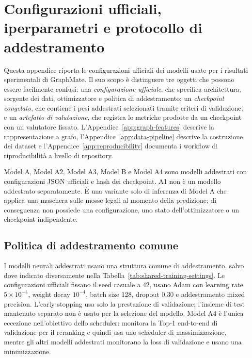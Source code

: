 \chapter{Configurazioni ufficiali, iperparametri e protocollo di addestramento}
\label{app:hyperparameters}

Questa appendice riporta le configurazioni ufficiali dei modelli usate per i risultati sperimentali di GraphMate.  Il suo scopo è distinguere tre oggetti che possono essere facilmente confusi: una \emph{configurazione ufficiale}, che specifica architettura, sorgente dei dati, ottimizzatore e politica di addestramento; un \emph{checkpoint congelato}, che contiene i pesi addestrati selezionati tramite criteri di validazione; e un \emph{artefatto di valutazione}, che registra le metriche prodotte da un checkpoint con un valutatore fissato.  L'Appendice~\ref{app:graph-features} descrive la rappresentazione a grafo, l'Appendice~\ref{app:data-pipeline} descrive la costruzione dei dataset e l'Appendice~\ref{app:reproducibility} documenta i workflow di riproducibilità a livello di repository.

Model A, Model A2, Model A3, Model B e Model A4 sono modelli addestrati con configurazioni JSON ufficiali e hash dei checkpoint.  A1 non è un modello addestrato separatamente.  È una variante solo di inferenza di Model A che applica una maschera sulle mosse legali al momento della predizione; di conseguenza non possiede una configurazione, uno stato dell'ottimizzatore o un checkpoint indipendente.

\section{Politica di addestramento comune}
\label{app:hyperparameters:shared}

I modelli neurali addestrati usano una struttura comune di addestramento, salvo dove indicato diversamente nella Tabella~\ref{tab:shared-training-settings}.  Le configurazioni ufficiali fissano il seed casuale a 42, usano Adam con learning rate \(5\times 10^{-4}\), weight decay \(10^{-4}\), batch size 128, dropout 0.30 e addestramento mixed precision.  L'early stopping usa solo la prestazione di validazione; l'insieme di test mantenuto separato non è usato per la selezione del modello.  Model A4 è l'unica eccezione nell'obiettivo dello scheduler: monitora la Top-1 end-to-end di validazione per il reranking e quindi usa uno scheduler di massimizzazione, mentre gli altri modelli addestrati monitorano la loss di validazione e usano una minimizzazione.

